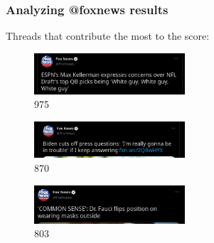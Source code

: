\documentclass{beamer}
\begin{document}
\begin{frame}[c]
	\frametitle{Analyzing @foxnews results}
	Threads that contribute the most to the score:
	\begin{figure}[htpb]
		\centering
		\includegraphics[width=0.5\textwidth]{out/foxnews4000/results/thread1.png}
		\caption{975}
		\label{fig:name}
	\end{figure}
	\begin{figure}[htpb]
		\centering
		\includegraphics[width=0.5\textwidth]{out/foxnews4000/results/thread2.png}
		\caption{870}
		\label{fig:name}
	\end{figure}
	\begin{figure}[htpb]
		\centering
		\includegraphics[width=0.5\textwidth]{out/foxnews4000/results/thread3.png}
		\caption{803}
		\label{fig:name}
	\end{figure}


\end{frame}
\end{document}
